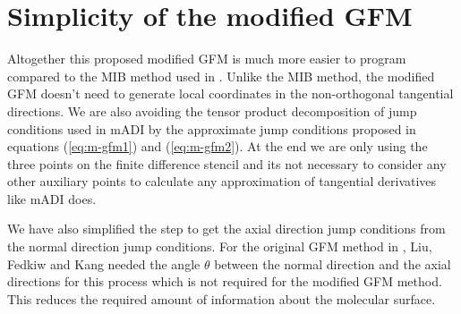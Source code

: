 	

\section{Simplicity of the modified GFM}

Altogether this proposed modified GFM is much more easier to program compared to the MIB method used in \cite{Zhihan2017}. Unlike the MIB method, the modified GFM doesn't need to generate local coordinates in the non-orthogonal tangential directions. We are also avoiding the tensor product decomposition of jump conditions used in mADI\cite{Zhihan2017} by the approximate jump conditions proposed in equations (\ref{eq:m-gfm1}) and (\ref{eq:m-gfm2}). At the end we are only using the three points on the finite difference stencil and its not necessary to consider any other auxiliary points to calculate any approximation of tangential derivatives like mADI does.    

We have also simplified the step to get the axial direction jump conditions from the normal direction jump conditions. For the original GFM method in \cite{Liu2000}, Liu, Fedkiw and Kang needed the angle $\theta$ between the normal direction and the axial directions for this process which is not required for the modified GFM method. This reduces the required amount of information about the molecular surface. 